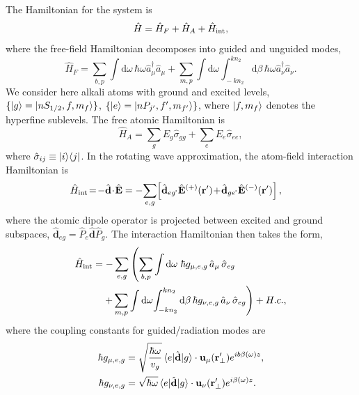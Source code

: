 \documentclass[aps,pra,twocolumn]{revtex4-1} %
\newcommand{\inter}{{\rm int}}
\begin{document}
The Hamiltonian for the system is
\begin{equation}
\hat{H} = \hat{H}_F+\hat{H}_A + \hat{H}_{\inter},
\end{equation}
where the free-field Hamiltonian decomposes into guided and unguided modes, 
	\begin{equation}
		\hat{H}_F = \!\sum_{b,p}\!\! \int\!\!\! \mathrm{d}\omega \, \hbar \omega \hat{a}^\dagger_\mu \hat{a}_\mu 
\!+\!\sum_{m,p}\! \int\!\!\! \mathrm{d}\omega\!\!\!  \int_{\!-k n_2}^{k n_2}\!\!\! \mathrm{d}\beta \, \hbar \omega 
\hat{a}^\dagger_\nu \hat{a}_\nu.
	\end{equation}
We consider here alkali atoms with ground and excited levels, $\{ \lvert{g}\rangle=\lvert{nS_{1/2}, f, m_f}\rangle\}$, $\{ \lvert{e}\rangle =\lvert{nP_{j'}, f', m_{f'}}\rangle\}$, where $\lvert{f, m_f}\rangle$ denotes the hyperfine sublevels.  The free atomic Hamiltonian is
	\begin{equation}
		\hat{H}_A  = \sum_g E_g \hat{\sigma}_{gg} + \sum_e E_e \hat{\sigma}_{ee},
	\end{equation}
where $\hat{\sigma}_{ij} \equiv \lvert{i}\rangle\langle{j}\rvert$.  In the rotating wave approximation, the atom-field interaction Hamiltonian is
	\begin{align}
		\hat{H}_{\inter} &\!=\! -\hat{\mathbf{d}}\!\cdot\! \hat{\mathbf{E}} =- \!\sum_{e,g}\! \left[ \hat{\mathbf{d}}_{eg}\!\!\cdot\! 
\hat{\mathbf{E}}^{(+)}(\br') \!+\! \hat{\mathbf{d}}_{ge}\!\!\cdot\! \hat{\mathbf{E}}^{(-)}(\br') \right],
	\end{align}
where the atomic dipole operator is projected between excited and ground subspaces, $\hat{\mathbf{d}}_{eg}= \hat{P}_e \hat{\mathbf{d}} \hat{P}_g $. The interaction Hamiltonian then takes the form, 
\begin{align}
	\hat{H}_{\inter} &= -\sum_{e,g} \left(\sum_{b,p} \int\mathrm{d}\omega \; \hbar g_{\mu, e,g}\, \hat{a}_\mu  \, 
		\hat{\sigma}_{eg}\right.\nonumber\\
	&\quad \left. + \sum_{m,p} \int\mathrm{d}\omega \! \int_{-kn_2}^{kn_2}\mathrm{d}\beta \,  \hbar 
g_{\nu, e,g}\, \hat{a}_\nu \, \hat{\sigma}_{eg}\right) + {H.c.},
	\end{align}
where the coupling constants for guided/radiation modes are
\begin{subequations} \label{Eq::CouplingConstants}
	\begin{align}
		\hbar g_{\mu, e,g} &= \sqrt{\frac{\hbar \omega}{ v_g  }}\, \langle{e}\rvert \hat{\mathbf{d}} \lvert{g}\rangle 
\cdot\mathbf{u}_\mu ( \mathbf{r}'_\perp ) e^{i b \beta(\omega)z} , \\
		\hbar g_{\nu, e,g} &= \sqrt{  \hbar \omega } \, \langle{e}\rvert \hat{\mathbf{d}} \lvert{g}\rangle \cdot \mathbf{u}_\nu ( \mathbf{r}'_\perp) e^{i\beta(\omega)z}  .
	\end{align}
\end{subequations}
\end{document}
